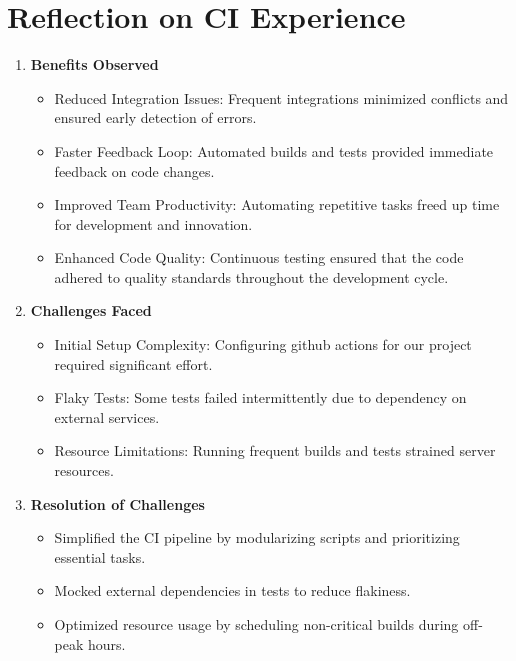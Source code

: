 \documentclass[a4paper,12pt]{article}
\begin{document}
\section{Reflection on CI Experience}
\begin{enumerate}
    \item \textbf{Benefits Observed}
        \begin{itemize}
            \item Reduced Integration Issues: Frequent integrations minimized conflicts and ensured early detection of errors.
            \item Faster Feedback Loop: Automated builds and tests provided immediate feedback on code changes.
            \item Improved Team Productivity: Automating repetitive tasks freed up time for development and innovation.
            \item Enhanced Code Quality: Continuous testing ensured that the code adhered to quality standards throughout the development cycle.
\end{itemize}
\item \textbf{Challenges Faced}
    \begin{itemize}
        \item Initial Setup Complexity: Configuring github actions for our project required significant effort.
        \item Flaky Tests: Some tests failed intermittently due to dependency on external services.
        \item Resource Limitations: Running frequent builds and tests strained server resources.
\end{itemize}
\item \textbf{Resolution of Challenges}
    \begin{itemize}
        \item Simplified the CI pipeline by modularizing scripts and prioritizing essential tasks.
        \item Mocked external dependencies in tests to reduce flakiness.
        \item Optimized resource usage by scheduling non-critical builds during off-peak hours.
\end{itemize}
\end{enumerate}
\end{document}
